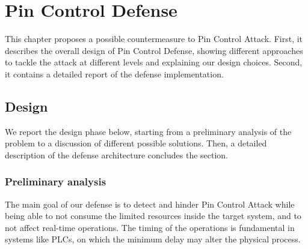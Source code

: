 \chapter{Pin Control Defense}
\label{chap:defense}

This chapter proposes a possible countermeasure to Pin Control Attack.
First, it describes the overall design of Pin Control Defense, showing different approaches to tackle the attack at different levels
and explaining our design choices. Second, it contains a detailed report of the defense implementation.


\section{Design}
We report the design phase below, starting from a preliminary analysis of the problem to a discussion of different possible solutions.
Then, a detailed description of the defense architecture concludes the section.


\subsection{Preliminary analysis}
\label{sec:pre_analysis}

The main goal of our defense is to detect and hinder Pin Control Attack while being able to not consume the limited resources inside the target system,
and to not affect real-time operations. The timing of the operations is fundamental in systems like PLCs, on which the minimum delay may alter the physical process.

